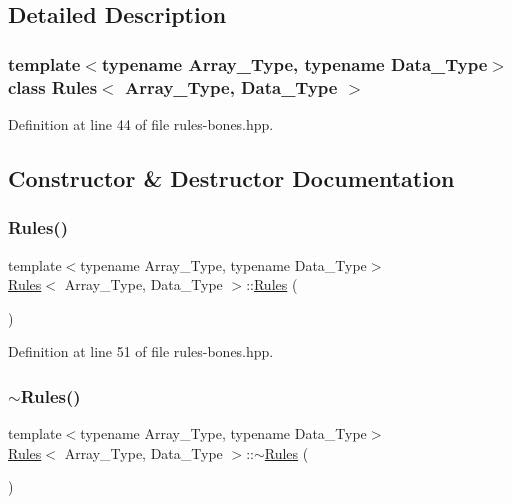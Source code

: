 \subsection{Detailed Description}
\subsubsection*{template$<$typename Array\+\_\+\+Type, typename Data\+\_\+\+Type$>$\newline
class Rules$<$ Array\+\_\+\+Type, Data\+\_\+\+Type $>$}



Definition at line 44 of file rules-\/bones.\+hpp.



\subsection{Constructor \& Destructor Documentation}
\mbox{\label{class_rules_aa78e9abf82ed8a0e4320d570191c8968}} 
\subsubsection{\texorpdfstring{Rules()}{Rules()}}
{\footnotesize\ttfamily template$<$typename Array\+\_\+\+Type, typename Data\+\_\+\+Type$>$ \\
\hyperlink{class_rules}{Rules}$<$ Array\+\_\+\+Type, Data\+\_\+\+Type $>$\+::\hyperlink{class_rules}{Rules} (\begin{DoxyParamCaption}{ }\end{DoxyParamCaption})\hspace{0.3cm}{\ttfamily [inline]}}



Definition at line 51 of file rules-\/bones.\+hpp.

\mbox{\label{class_rules_aa76d96c2316bc4a2a26bf4ec7b8d9463}} 
\subsubsection{\texorpdfstring{$\sim$\+Rules()}{~Rules()}}
{\footnotesize\ttfamily template$<$typename Array\+\_\+\+Type, typename Data\+\_\+\+Type$>$ \\
\hyperlink{class_rules}{Rules}$<$ Array\+\_\+\+Type, Data\+\_\+\+Type $>$\+::$\sim$\hyperlink{class_rules}{Rules} (\begin{DoxyParamCaption}{ }\end{DoxyParamCaption})\hspace{0.3cm}{\ttfamily [inline]}}



